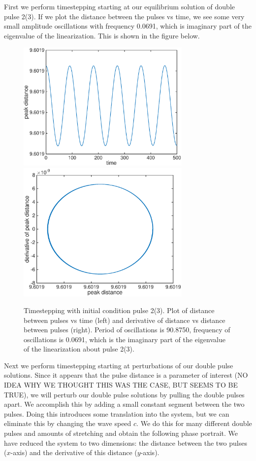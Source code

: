 \documentclass[12pt]{article}
\begin{document}
First we perform timestepping starting at our equilibrium solution of double pulse 2(3). If we plot the distance between the pulses vs time, we see some very small amplitude oscillations with frequency 0.0691, which is imaginary part of the eigenvalue of the linearization. This is shown in the figure below.

\begin{figure}[H]
	\includegraphics[width=8.5cm]{cheb10dist2_0}
	\includegraphics[width=8.5cm]{cheb10deriv2_0}
	\caption{Timestepping with initial condition pulse 2(3). Plot of distance between pulses vs time (left) and derivative of distance vs distance between pulses (right). Period of oscillations is 90.8750, frequency of oscillations is 0.0691, which is the imaginary part of the eigenvalue of the linearization about pulse 2(3).}
\end{figure}

Next we perform timestepping starting at perturbations of our double pulse solutions. Since it appears that the pulse distance is a parameter of interest (NO IDEA WHY WE THOUGHT THIS WAS THE CASE, BUT SEEMS TO BE TRUE), we will perturb our double pulse solutions by pulling the double pulses apart. We accomplish this by adding a small constant segment between the two pulses. Doing this introduces some translation into the system, but we can eliminate this by changing the wave speed $c$. We do this for many different double pulses and amounts of stretching and obtain the following phase portrait. We have reduced the system to two dimensions: the distance between the two pulses ($x$-axis) and the derivative of this distance ($y$-axis).
\end{document}
